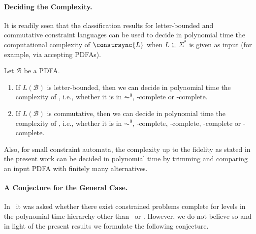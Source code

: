 \paragraph{Deciding the Complexity.} It is readily seen that 
the classification results for letter-bounded and commutative constraint
languages can be used to decide in polynomial time the computational complexity
of $\constrsync{L}$ when $L \subseteq \Sigma^*$ is given as input (for example, via accepting PDFAs). 

\begin{theorem}
	Let $\mathcal B$ be a PDFA.
	\begin{enumerate}
		\item If $L(\mathcal B)$ is letter-bounded, then we can decide in polynomial time the complexity of ,
		i.e., whether it is in $\AC^0$, \LOGSPACE-complete or \NP-complete.
		
		\item If $L(\mathcal B)$ is commutative, then we can decide  in polynomial time the complexity of , i.e.,
		whether it is in $\AC^0$, \LOGSPACE-complete, \NL-complete, \NP-complete or \PSPACE-complete.
	\end{enumerate}	
\end{theorem} 

Also, for small constraint automata, the complexity up to the fidelity as stated
in the present work can be decided in polynomial time by trimming and comparing
an input PDFA with finitely many alternatives.

\paragraph{A Conjecture for the General Case.} In~\cite[Conclusions and Prospects]{FernauGHHVW19} 
it was asked whether there exist constrained problems complete
for levels in the polynomial time hierarchy other than \NP\ or \PSPACE.
However, we do not believe so and in light of the present results
we formulate the following conjecture.

\begin{center}
\end{center}

